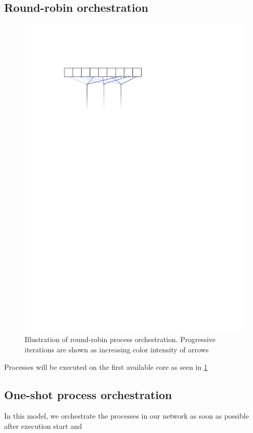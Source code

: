 \subsection{Round-robin orchestration}
\begin{figure}
\centering
\includegraphics{figures/roundrobin}

\caption[Round-robin orchestration]{Illustration of round-robin
  process orchestration. Progressive iterations are shown as
  increasing color intensity of arrows}

\label{fig:roundrobin}

\end{figure}


Processes will be executed on the first available core as seen in
\cref{fig:roundrobin}


\subsection{One-shot process orchestration}
In this model, we orchestrate the processes in our network as soon as
possible after execution start and

